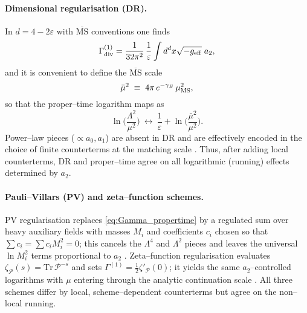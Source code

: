 \documentclass{iopjournal}
\begin{document}
\paragraph{Dimensional regularisation (DR).}
In $d=4-2\varepsilon$ with $\overline{\mathrm{MS}}$ conventions one finds
\begin{equation}
\Gamma^{(1)}_{\rm div}
=\frac{1}{32\pi^2}\,\frac{1}{\varepsilon}\int d^dx\sqrt{-g_{\rm eff}}\;a_2,
\label{eq:DR_div}
\end{equation}
and it is convenient to define the $\overline{\mathrm{MS}}$ scale
\begin{equation}
\bar\mu^2 \;\equiv\; 4\pi\,e^{-\gamma_E}\,\mu_{\rm MS}^2,
\label{eq:muMSbar}
\end{equation}
so that the proper–time logarithm maps as
\begin{equation}
\ln\!\Big(\frac{\Lambda^2}{\mu^2}\Big)\ \longleftrightarrow\
\frac{1}{\varepsilon}+\ln\!\Big(\frac{\bar\mu^2}{\mu^2}\Big).
\label{eq:PT_to_DR_map}
\end{equation}
Power–law pieces ($\propto a_0,a_1$) are absent in DR and are effectively encoded in the choice of finite counterterms at the matching scale \cite{ParkerToms}. Thus, after adding local counterterms, DR and proper–time agree on all logarithmic (running) effects determined by $a_2$.




\paragraph{Pauli–Villars (PV) and zeta–function schemes.}
PV regularisation replaces \eqref{eq:Gamma_propertime} by a regulated sum over heavy auxiliary fields with masses $M_i$ and coefficients $c_i$ chosen so that $\sum c_i=\sum c_i M_i^2=0$; this cancels the $\Lambda^4$ and $\Lambda^2$ pieces and leaves the universal $\ln M_i^2$ terms proportional to $a_2$ \cite[Ch.~3]{ParkerToms}. Zeta–function regularisation evaluates $\zeta_{\mathcal{P}}(s)=\mathrm{Tr}\,\mathcal{P}^{-s}$ and sets $\Gamma^{(1)}=\tfrac{1}{2}\zeta'_{\mathcal{P}}(0)$; it yields the same $a_2$–controlled logarithms with $\mu$ entering through the analytic continuation scale \cite[\S2]{Vassilevich2003}. All three schemes differ by local, scheme–dependent counterterms but agree on the non–local running.
\end{document}
